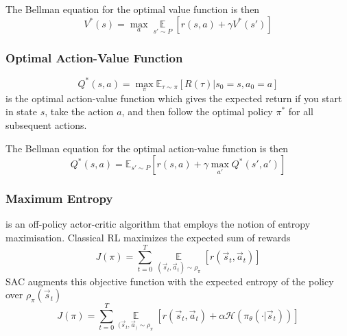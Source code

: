 The Bellman equation for the optimal value function is then
\begin{equation}
    V^*(s) = \max_a
    \operatorname*{\mathbb{E}}\limits_{s' \sim P}\left[r(s,a)+\gamma V^*(s')\right]
\end{equation}

\subsubsection{Optimal Action-Value Function}
\begin{equation}
    Q^*(s, a) = \max_\pi\mathbb{E}_{\tau\sim\pi}
    \left[R(\tau)|s_0=s, a_0=a\right]
\end{equation}
is the optimal action-value function which gives the expected return if you start in state $s$, take the action $a$, and then follow the optimal policy $\pi^*$ for all subsequent actions.

The Bellman equation for the optimal action-value function is then
\begin{equation}
    Q^*(s, a) = \mathbb{E}_{s'\sim P}
    \left[r(s,a) + \gamma \max_{a'}Q^*(s',a')\right]
\end{equation}

\subsubsection{Maximum Entropy}

 \cite{haarnoja_soft_2018} is an off-policy actor-critic algorithm that employs the notion of entropy maximisation. Classical RL maximizes the expected sum of rewards
\begin{equation}
    J(\pi) = \sum_{t=0}^T \operatorname*{\mathbb{E}}\limits_{(\vec s_t, \vec a_t) \sim \rho_\pi}\left[r(\vec s_t, \vec a_t)\right]
\end{equation}
SAC augments this objective function with the expected entropy of the policy over $\rho_\pi(\vec s_t)$
\begin{equation}
    J(\pi) = \sum_{t=0}^T \operatorname*{\mathbb{E}}\limits_{(\vec s_t, \vec a_) \sim \rho_\pi}\left[
        r(\vec s_t, \vec a_t)
        +
        \alpha \mathcal{H}(\pi_\theta(\cdot|\vec s_t))
    \right]
\end{equation}

